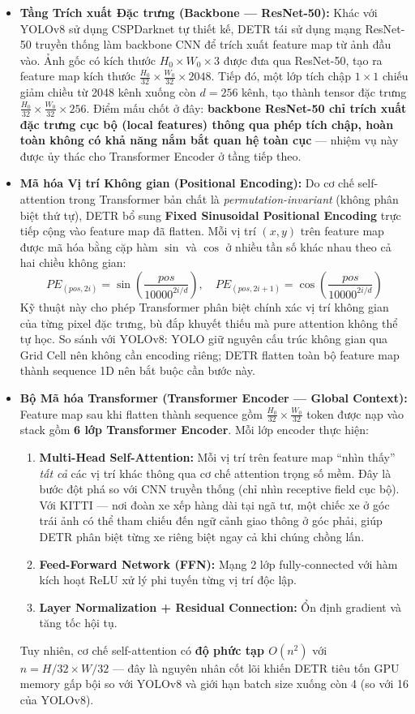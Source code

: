 \begin{itemize}
	\item \textbf{Tầng Trích xuất Đặc trưng (Backbone --- ResNet-50):} Khác với YOLOv8 sử dụng CSPDarknet tự thiết kế, DETR tái sử dụng mạng ResNet-50 truyền thống làm backbone CNN để trích xuất feature map từ ảnh đầu vào. Ảnh gốc có kích thước $H_0 \times W_0 \times 3$ được đưa qua ResNet-50, tạo ra feature map kích thước $\frac{H_0}{32} \times \frac{W_0}{32} \times 2048$. Tiếp đó, một lớp tích chập $1 \times 1$ chiếu giảm chiều từ 2048 kênh xuống còn $d = 256$ kênh, tạo thành tensor đặc trưng $\frac{H_0}{32} \times \frac{W_0}{32} \times 256$. Điểm mấu chốt ở đây: \textbf{backbone ResNet-50 chỉ trích xuất đặc trưng cục bộ (local features) thông qua phép tích chập, hoàn toàn không có khả năng nắm bắt quan hệ toàn cục} --- nhiệm vụ này được ủy thác cho Transformer Encoder ở tầng tiếp theo.

	\item \textbf{Mã hóa Vị trí Không gian (Positional Encoding):} Do cơ chế self-attention trong Transformer bản chất là \textit{permutation-invariant} (không phân biệt thứ tự), DETR bổ sung \textbf{Fixed Sinusoidal Positional Encoding} trực tiếp cộng vào feature map đã flatten. Mỗi vị trí $(x, y)$ trên feature map được mã hóa bằng cặp hàm $\sin$ và $\cos$ ở nhiều tần số khác nhau theo cả hai chiều không gian:
	$$PE_{(pos, 2i)} = \sin\left(\frac{pos}{10000^{2i/d}}\right), \quad PE_{(pos, 2i+1)} = \cos\left(\frac{pos}{10000^{2i/d}}\right)$$
	Kỹ thuật này cho phép Transformer phân biệt chính xác vị trí không gian của từng pixel đặc trưng, bù đắp khuyết thiếu mà pure attention không thể tự học. So sánh với YOLOv8: YOLO giữ nguyên cấu trúc không gian qua Grid Cell nên không cần encoding riêng; DETR flatten toàn bộ feature map thành sequence 1D nên bắt buộc cần bước này.

	\item \textbf{Bộ Mã hóa Transformer (Transformer Encoder --- Global Context):} Feature map sau khi flatten thành sequence gồm $\frac{H_0}{32} \times \frac{W_0}{32}$ token được nạp vào stack gồm \textbf{6 lớp Transformer Encoder}. Mỗi lớp encoder thực hiện:
	\begin{enumerate}
		\item \textbf{Multi-Head Self-Attention:} Mỗi vị trí trên feature map ``nhìn thấy'' \textit{tất cả} các vị trí khác thông qua cơ chế attention trọng số mềm. Đây là bước đột phá so với CNN truyền thống (chỉ nhìn receptive field cục bộ). Với KITTI --- nơi đoàn xe xếp hàng dài tại ngã tư, một chiếc xe ở góc trái ảnh có thể tham chiếu đến ngữ cảnh giao thông ở góc phải, giúp DETR phân biệt từng xe riêng biệt ngay cả khi chúng chồng lấn.
		\item \textbf{Feed-Forward Network (FFN):} Mạng 2 lớp fully-connected với hàm kích hoạt ReLU xử lý phi tuyến từng vị trí độc lập.
		\item \textbf{Layer Normalization + Residual Connection:} Ổn định gradient và tăng tốc hội tụ.
	\end{enumerate}
	Tuy nhiên, cơ chế self-attention có \textbf{độ phức tạp $O(n^2)$} với $n = H/32 \times W/32$ --- đây là nguyên nhân cốt lõi khiến DETR tiêu tốn GPU memory gấp bội so với YOLOv8 và giới hạn batch size xuống còn 4 (so với 16 của YOLOv8).


\end{itemize}
